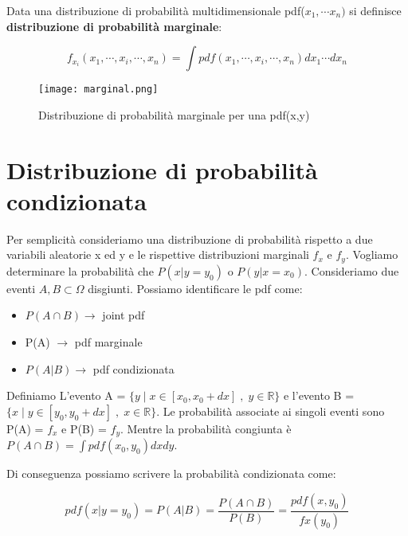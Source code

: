 \documentclass[11pt,a4paper]{book}
\begin{document}
Data una distribuzione di probabilit\`{a} multidimensionale pdf($x_1,\cdots x_n)$ si definisce \textbf{distribuzione di probabilit\`{a} marginale}:

\begin{equation}
	f_{x_i}(x_1, \cdots,x_{i},\cdots,x_n) = \int pdf(x_1,\cdots,x_i,\cdots,x_n)dx_1\cdots dx_n
\end{equation}

 
\begin{figure}[ht]
\vspace{0.in}
\texttt{[image: marginal.png]}	
\centering
\vspace{0.in}
\caption{Distribuzione di probabilit\`{a} marginale per una pdf(x,y)}
\end{figure}



\section{Distribuzione di probabilit\`{a} condizionata}

Per semplicit\`{a} consideriamo una distribuzione di probabilit\`{a} rispetto a due variabili aleatorie x ed y e le rispettive distribuzioni marginali $f_x$ e $f_y$. Vogliamo determinare la  probabilit\`{a} che $P(x \vert y = y_0)$ o $P(y \vert x = x_0) $. Consideriamo due eventi $A,B \subset \Omega$ disgiunti. Possiamo identificare le pdf come:

\begin{itemize}
	\item $P(A \cap B) \rightarrow $ joint pdf
	\item P(A) $\rightarrow$ pdf marginale
	\item $P(A|B) \rightarrow $ pdf condizionata
\end{itemize}

\noindent Definiamo L'evento A = $\{ y \; \vert \; x \in [x_0,x_0 +dx]\;,\; y \in \mathbb{R} \} $ e l'evento B = $\{ x \; \vert \; y \in [y_0,y_0 +dx]\;,\; x \in \mathbb{R} \} $. Le probabilit\`{a} associate ai singoli eventi sono P(A) = $f_x$ e P(B) = $f_y$. Mentre la probabilit\`{a} congiunta \`{e} $P(A \cap B) = \int pdf(x_0,y_0)dxdy$. 

Di conseguenza possiamo scrivere la probabilit\`{a} condizionata come:

\begin{equation}
	pdf(x \vert y = y_0) = P(A\vert B) = \dfrac{P(A \cap B)}{P(B)} = \dfrac{pdf(x,y_0)}{fx(y_0)}
\end{equation}
\end{document}
